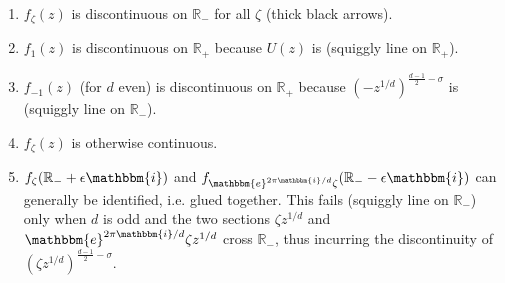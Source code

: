 \documentclass[12pt]{article}
\newcommand{\ee}[0] {\mathbbm{e}}
\newcommand{\ii}[0] {\mathbbm{i}}
\numberwithin{equation}{section}
\begin{document}
\begin{enumerate}
\item{$f_{\zeta}(z)$ is discontinuous on $\mathbb{R}_{-}$ for all $\zeta$ (thick black arrows).}
\item{$f_1(z)$ is discontinuous on $\mathbb{R}_{+}$ because $U(z)$ is (squiggly line on $\mathbb{R}_{+}$).}
\item{$f_{-1}(z)$ (for $d$ even) is discontinuous on $\mathbb{R}_{+}$ because $(-z^{1/d})^{\frac{d-1}{2}-\sigma}$} is (squiggly line on $\mathbb{R}_{-}$).
\item{$f_{\zeta}(z)$ is otherwise continuous.}
\item{$f_{\zeta}(\mathbb{R}_{-} + \epsilon \ii)$ and $f_{\ee^{2\pi \ii/d}\zeta}(\mathbb{R}_{-} - \epsilon \ii)$ can generally be identified, i.e. glued together. This fails (squiggly line on $\mathbb{R}_{-}$) only when $d$ is odd and the two sections $\zeta z^{1/d}$ and $\ee^{2\pi \ii/d}\zeta z^{1/d}$ cross $\mathbb{R}_{-}$, thus incurring the discontinuity of $(\zeta z^{1/d})^{\frac{d-1}{2}-\sigma}$.}
\end{enumerate}
\end{document}
